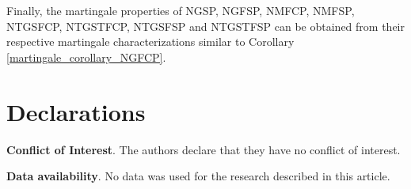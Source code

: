 \documentclass[11pt,oneside,reqno]{amsart}
\theoremstyle{definition}
\newtheorem{proposition}{Proposition}[section]
\theoremstyle{remarkstyle}
\begin{document}
Finally, the martingale properties of NGSP, NGFSP, NMFCP, NMFSP, NTGSFCP, NTGSTFCP, NTGSFSP and NTGSTFSP can be obtained from their respective martingale characterizations similar to Corollary \ref{martingale_corollary_NGFCP}.

\section*{Declarations}
\noindent 
{\bf Conflict of Interest}. The authors declare that they have no conflict of interest.

\noindent
{\bf Data availability}. No data was used for the research described in this article.




\end{document}
